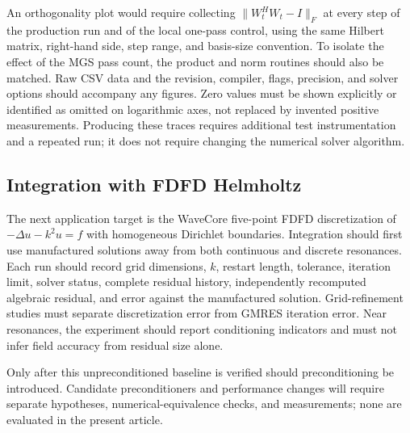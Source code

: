 An orthogonality plot would require collecting
$\lVert W_t^H W_t-I\rVert_F$ at every step of the production run and of the
local one-pass control, using the same Hilbert matrix, right-hand side, step
range, and basis-size convention. To isolate the effect of the MGS pass count,
the product and norm routines should also be matched. Raw CSV data and the
revision, compiler, flags, precision, and solver options should accompany any
figures. Zero values must be shown explicitly or identified as omitted on
logarithmic axes, not replaced by invented positive measurements. Producing
these traces requires additional test instrumentation and a repeated run; it
does not require changing the numerical solver algorithm.

\subsection{Integration with FDFD Helmholtz}

The next application target is the WaveCore five-point FDFD discretization of
$-\Delta u-k^2u=f$ with homogeneous Dirichlet boundaries. Integration should
first use manufactured solutions away from both continuous and discrete
resonances. Each run should record grid dimensions, $k$, restart length, tolerance,
iteration limit, solver status, complete residual history, independently
recomputed algebraic residual, and error against the manufactured solution.
Grid-refinement studies must separate discretization error from GMRES iteration
error. Near resonances, the experiment should report conditioning indicators and
must not infer field accuracy from residual size alone.

Only after this unpreconditioned baseline is verified should preconditioning be
introduced. Candidate preconditioners and performance changes will require
separate hypotheses, numerical-equivalence checks, and measurements; none are
evaluated in the present article.
